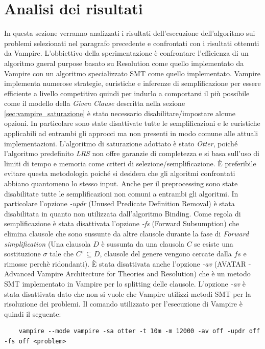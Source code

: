 \documentclass[./main.tex]{subfiles}
\begin{document}
\section{Analisi dei risultati}
In questa sezione verranno analizzati i risultati dell'esecuzione dell'algoritmo sui problemi selezionati nel paragrafo precedente
e confrontati con i risultati ottenuti da Vampire. 
L'obbiettivo della sperimentazione è confrontare l'efficienza di un algoritmo gneral purpose basato su Resolution come quello implementato da Vampire
con un algoritmo specializzato SMT come quello implementato.
Vampire implementa numerose strategie, euristiche e inferenze di semplificazione per essere efficiente a livello competitivo
quindi per indurlo a comportarsi il più possibile come il modello della \textit{Given Clause} descritta 
nella sezione \ref{sec:vampire_saturazione} è stato necessario disabilitare/impostare alcune opzioni.
In particolare sono state disattivate tutte le semplificazioni 
e le euristiche applicabili ad entrambi gli approcci ma non presenti in modo comune alle attuali implementazioni.
L'algoritmo di saturazione adottato è stato \textit{Otter}, 
poiché l'algoritmo predefinito \textit{LRS} non offre garanzie di completezza e
si basa sull'uso di limiti di tempo e memoria come criteri di selezione/semplificazione. 
È preferibile evitare questa metodologia poiché si desidera che gli algoritmi confrontati abbiano quantomeno lo stesso input.
Anche per il preprocessing sono state disabilitate tutte le semplificazioni non comuni a entrambi gli algoritmi.
In particolare l'opzione \textit{-updr} (Unused Predicate Definition Removal) è stata disabilitata in quanto non utilizzata dall'algoritmo
Binding. 
Come regola di semplificazione è stata disattivata l'opzione \textit{-fs} (Forward Subsumption) che elimina 
clausole che sono sussunte da altre clausole durante la fase di \textit{Forward simplification} 
(Una clausola $D$ è sussunta da una clausola $C$ se esiste una sostituzione $\sigma$ tale che 
$C^\sigma \subseteq D$, clausole del genere vengono cercate dalla $fs$ e rimosse perchè ridondanti).
È stata disattivata anche l'opzione \textit{-av} (AVATAR - Advanced Vampire Architecture
for Theories and Resolution) che è un metodo SMT implementato in Vampire per lo splitting delle clausole.
L'opzione \textit{-av} è stata disattivata dato che non si vuole che Vampire utilizzi metodi SMT per la risoluzione dei problemi.
Il comando utilizzato per l'esecuzione di Vampire è quindi il seguente:
\begin{verbatim}
    vampire --mode vampire -sa otter -t 10m -m 12000 -av off -updr off -fs off <problem>
\end{verbatim}
\end{document}
